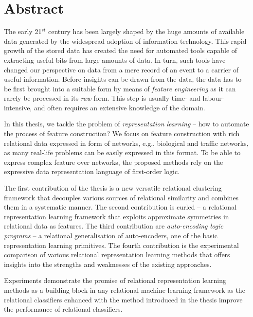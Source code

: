 \chapter{Abstract}                                 \label{ch:abstract}

The early 21$^{st}$ century has been largely shaped by the huge amounts of available data generated by the widespread adoption of information technology.
This rapid growth of the stored data has created the need for automated tools capable of extracting useful bits from large amounts of data.
In turn, such tools have changed our perspective on data from a mere record of an event to a carrier of useful information.
Before insights can be drawn from the data, the data has to be first brought into a suitable form by means of \textit{feature engineering} as it can rarely be processed in its \textit{raw} form.
This step is usually time- and labour-intensive, and often requires an extensive knowledge of the domain.


In this thesis, we tackle the problem of \textit{representation learning} -- how to automate the process of feature construction?
We focus on feature construction with rich relational data expressed in form of networks, e.g., biological and traffic networks, as many real-life problems can be easily expressed in this format.
To be able to express complex feature over networks, the proposed methods rely on the expressive data representation language of first-order logic.


The first contribution of the thesis is a new versatile relational clustering framework that decouples various sources of relational similarity and combines them in a systematic manner.
The second contribution is \gls{curled} -- a relational representation learning framework that exploits approximate symmetries in relational data as features.
The third contribution are \textit{auto-encoding logic programs}  -- a relational generalisation of auto-encoders, one of the basic representation learning primitives.
The fourth contribution is the experimental comparison of various relational representation learning methods that offers insights into the strengths and weaknesses of the existing approaches.


Experiments demonstrate the promise of relational representation learning methods as a building block in any relational machine learning framework as the relational classifiers enhanced with the method introduced in the thesis improve the performance of relational classifiers.



\cleardoublepage

